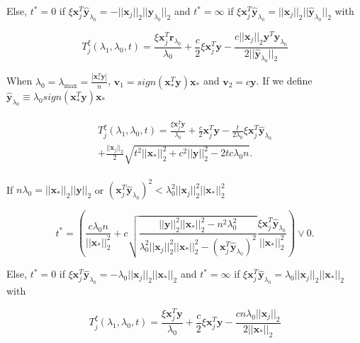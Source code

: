 Else, $t^*=0$ if $\xi\boldsymbol x_j^T\hat{\boldsymbol y}_{\lambda_0}=-||\boldsymbol x_j||_2||\hat{\boldsymbol y}_{\lambda_0}||_2$ and $t^*=\infty$ if $\xi\boldsymbol x_j^T\hat{\boldsymbol y}_{\lambda_0}=||\boldsymbol x_j||_2||\hat{\boldsymbol y}_{\lambda_0}||_2$ with

\begin{equation}
    T^\xi_j(\lambda_1,\lambda_0,t)=\frac{\xi \boldsymbol x_j^T \boldsymbol r_{\lambda_0}}{\lambda_0}+\frac{c}{2}\xi\boldsymbol x_j^T\boldsymbol y-\frac{c||\boldsymbol x_j||_2\boldsymbol y^T\hat{\boldsymbol y}_{\lambda_0}}{2||\hat{\boldsymbol y}_{\lambda_0}||_2}
\end{equation}

When $\lambda_0=\lambda_{\max}=\frac{|\boldsymbol x_*^T\boldsymbol y|}{n}$, $\boldsymbol v_1=sign(\boldsymbol x_*^T\boldsymbol y)\boldsymbol x_*$ and $\boldsymbol v_2=c\boldsymbol y$. If we define $\hat{\boldsymbol y}_{\lambda_0}\equiv \lambda_0sign(\boldsymbol x_*^T\boldsymbol y) \boldsymbol x_*$

\begin{gather}
    \begin{aligned}
        T^\xi_j(\lambda_1,\lambda_0,t)= \frac{\xi \boldsymbol x_j^T \boldsymbol y}{\lambda_0}+ \frac{c}{2}\boldsymbol x_j^T\boldsymbol y-\frac{t}{2\lambda_0}\xi\boldsymbol x_j^T\hat{\boldsymbol y}_{\lambda_0}\\
        +\frac{||\boldsymbol x_j||_2}{2}\sqrt{t^2||\boldsymbol x_*||_2^2+c^2||\boldsymbol y||_2^2-2tc\lambda_0n}.
    \end{aligned}
\end{gather}

If $n\lambda_0=||\boldsymbol x_*||_2||\boldsymbol y||_2$ or $(\boldsymbol x_j^T\hat{\boldsymbol y}_{\lambda_0})^2<\lambda_0^2||\boldsymbol x_j||_2^2||\boldsymbol x_*||_2^2$

\begin{equation}
    t^*=\left(\frac{c\lambda_0n}{||\boldsymbol x_*||_2^2}+c\sqrt{\frac{||\boldsymbol y||_2^2||\boldsymbol x_*||_2^2-n^2\lambda_0^2}{\lambda_0^2||\boldsymbol x_j||_2^2||\boldsymbol x_*||_2^2-(\boldsymbol x_j^T\hat{\boldsymbol y}_{\lambda_0})^2}}\frac{\xi\boldsymbol x_j^T\hat{\boldsymbol y}_{\lambda_0}}{||\boldsymbol x_*||_2^2}\right)\vee 0.
\end{equation}

Else, $t^*=0$ if $\xi\boldsymbol x_j^T\hat{\boldsymbol y}_{\lambda_0}=-\lambda_0||\boldsymbol x_j||_2||\boldsymbol x_*||_2$ and $t^*=\infty$ if $\xi\boldsymbol x_j^T\hat{\boldsymbol y}_{\lambda_0}=\lambda_0||\boldsymbol x_j||_2||\boldsymbol x_*||_2$ with

\begin{equation}
    T^\xi_j(\lambda_1,\lambda_0,t)=\frac{\xi \boldsymbol x_j^T \boldsymbol y}{\lambda_0}+\frac{c}{2}\xi\boldsymbol x_j^T\boldsymbol y-\frac{cn\lambda_0||\boldsymbol x_j||_2}{2||\boldsymbol x_*||_2}
\end{equation}



